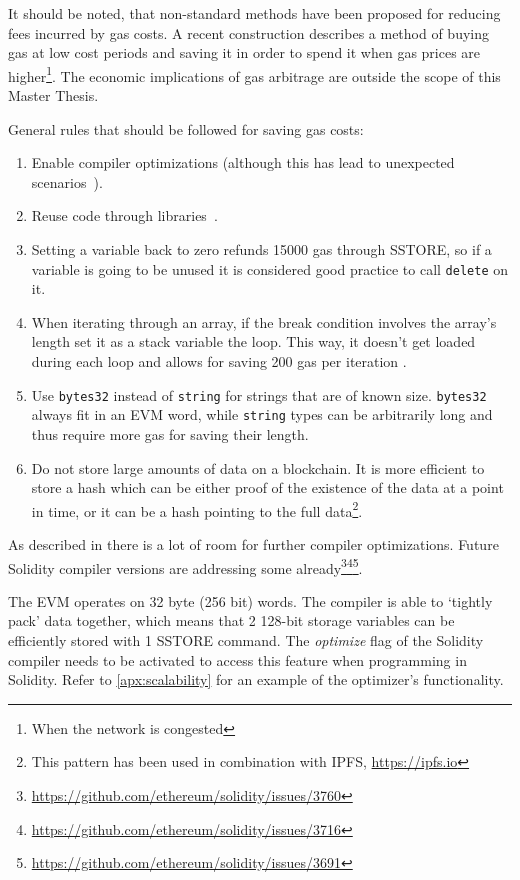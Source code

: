 It should be noted, that non-standard methods have been proposed for reducing fees incurred by gas costs. A recent construction \cite{gastoken} describes a method of buying gas at low cost periods and saving it in order to spend it when gas prices are higher\footnote{When the network is congested}. The economic implications of gas arbitrage are outside the scope of this Master Thesis. 

General rules that should be followed for saving gas costs:
\begin{enumerate}
    \item Enable compiler optimizations (although this has lead to unexpected scenarios~\cite{compiler}).
    \item Reuse code through libraries~\cite{library}.
    \item Setting a variable back to zero refunds 15000 gas through SSTORE, so if a variable is going to be unused it is considered good practice to call \texttt{delete} on it. 
    \item When iterating through an array, if the break condition involves the array's length set it as a stack variable the loop. This way, it doesn't get loaded during each loop and allows for saving 200 gas per iteration \cite{DBLP:journals/corr/ChenLLZ17}.
    \item Use \texttt{bytes32} instead of \texttt{string} for strings that are of known size. \texttt{bytes32} always fit in an EVM word, while \texttt{string} types can be arbitrarily long and thus require more gas for saving their length.
    \item Do not store large amounts of data on a blockchain. It is more efficient to store a hash which can be either proof of the existence of the data at a point in time, or it can be a hash pointing to the full data\footnote{This pattern has been used in combination with IPFS, \url{https://ipfs.io}}.
\end{enumerate}

As described in \cite{DBLP:journals/corr/ChenLLZ17} there is a lot of room for further compiler optimizations. Future Solidity compiler versions are addressing some already\footnote{\url{https://github.com/ethereum/solidity/issues/3760}}\footnote{\url{https://github.com/ethereum/solidity/issues/3716}}\footnote{\url{https://github.com/ethereum/solidity/issues/3691}}.

The EVM operates on 32 byte (256 bit) words. The compiler is able to `tightly pack' data together, which means that 2 128-bit storage variables can be efficiently stored with 1 SSTORE command. The \textit{optimize} flag of the Solidity compiler needs to be activated to access this feature when programming in Solidity. Refer to \ref{apx:scalability} for an example of the optimizer's functionality.

